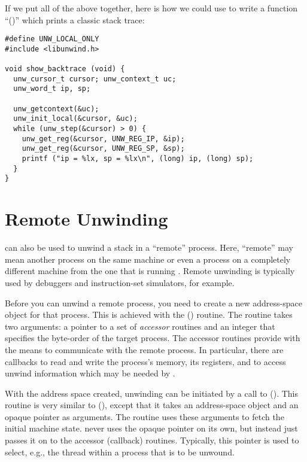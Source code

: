 \documentclass{article}
\begin{document}
If we put all of the above together, here is how we could use
 to write a function ``()''
which prints a classic stack trace:

\begin{verbatim}
#define UNW_LOCAL_ONLY
#include <libunwind.h>

void show_backtrace (void) {
  unw_cursor_t cursor; unw_context_t uc;
  unw_word_t ip, sp;

  unw_getcontext(&uc);
  unw_init_local(&cursor, &uc);
  while (unw_step(&cursor) > 0) {
    unw_get_reg(&cursor, UNW_REG_IP, &ip);
    unw_get_reg(&cursor, UNW_REG_SP, &sp);
    printf ("ip = %lx, sp = %lx\n", (long) ip, (long) sp);
  }
}
\end{verbatim}


\section{Remote Unwinding}

 can also be used to unwind a stack in a ``remote''
process.  Here, ``remote'' may mean another process on the same
machine or even a process on a completely different machine from the
one that is running .  Remote unwinding is typically
used by debuggers and instruction-set simulators, for example.

Before you can unwind a remote process, you need to create a new
address-space object for that process.  This is achieved with the
() routine.  The routine takes two
arguments: a pointer to a set of \emph{accessor} routines and an
integer that specifies the byte-order of the target process.  The
accessor routines provide  with the means to
communicate with the remote process.  In particular, there are
callbacks to read and write the process's memory, its registers, and
to access unwind information which may be needed by .

With the address space created, unwinding can be initiated by a call
to ().  This routine is very similar to
(), except that it takes an address-space
object and an opaque pointer as arguments.  The routine uses these
arguments to fetch the initial machine state.   never
uses the opaque pointer on its own, but instead just passes it on to
the accessor (callback) routines.  Typically, this pointer is used to
select, e.g., the thread within a process that is to be unwound.
\end{document}
